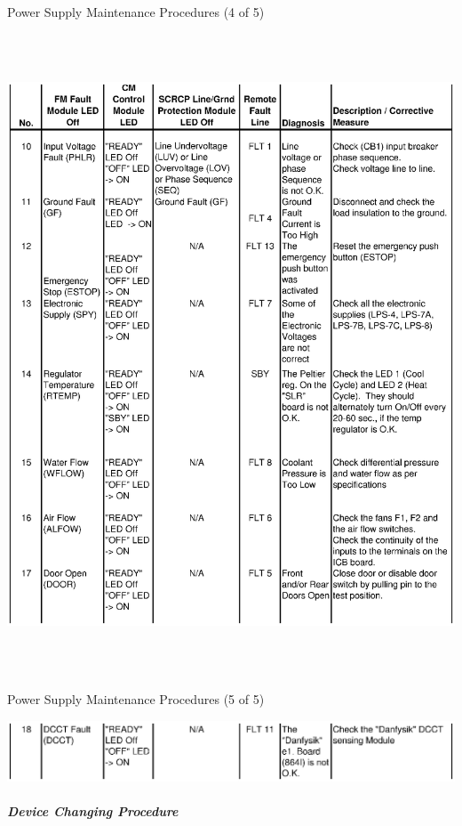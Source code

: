 \clearpage
\begin{table}
\caption{Power Supply Maintenance Procedures (4 of 5)} \label{tab:ps_maint_4}
\includegraphics[height=7.5in,width=6.2in]{spectrometers/book4.ps}
\end{table}

\clearpage
\begin{table}
\caption{Power Supply Maintenance Procedures (5 of 5) \label{tab:ps_maint_5}}
\includegraphics[width=6.2in]{spectrometers/book5.ps}
\end{table}
\clearpage


\subparagraph{Device Changing Procedure}

